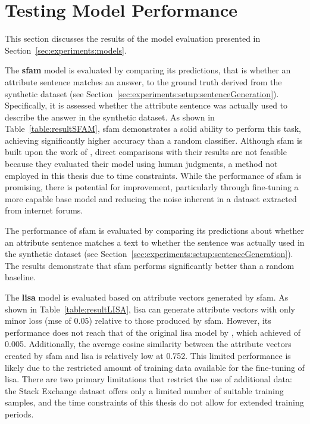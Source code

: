 \section{Testing Model Performance}%
\label{sec:evaluation:models}

This section discusses the results of the model evaluation presented in Section~\ref{sec:experiments:models}.

The \textbf{\acs{sfam}} model is evaluated by comparing its predictions, that is whether an attribute sentence matches an answer, to the ground truth derived from the synthetic dataset (see Section~\ref{sec:experiments:setup:sentenceGeneration}). Specifically, it is assessed whether the attribute sentence was actually used to describe the answer in the synthetic dataset. As shown in Table~\ref{table:resultSFAM}, \ac{sfam} demonstrates a solid ability to perform this task, achieving significantly higher accuracy than a random classifier. Although \ac{sfam} is built upon the work of \citet{patelLearningInterpretableStyle2023}, direct comparisons with their results are not feasible because they evaluated their model using human judgments, a method not employed in this thesis due to time constraints. While the performance of \ac{sfam} is promising, there is potential for improvement, particularly through fine-tuning a more capable base model and reducing the noise inherent in a dataset extracted from internet forums.

\begin{table}[ht]
  \caption[]{The performance of \ac{sfam} is evaluated by comparing its predictions about whether an attribute sentence matches a text to whether the sentence was actually used in the synthetic dataset (see Section~\ref{sec:experiments:setup:sentenceGeneration}). The results demonstrate that \ac{sfam} performs significantly better than a random baseline.}%
  \label{table:resultSFAM}
  \centering
  \resultSfam{}
\end{table}

The \textbf{\acs{lisa}} model is evaluated based on attribute vectors generated by \ac{sfam}. As shown in Table~\ref{table:resultLISA}, \ac{lisa} can generate attribute vectors with only minor loss (\acs{mse} of \num{0.05}) relative to those produced by \ac{sfam}. However, its performance does not reach that of the original \ac{lisa} model by \citet{patelLearningInterpretableStyle2023}, which achieved  of \num{0.005}. Additionally, the average cosine similarity between the attribute vectors created by \ac{sfam} and \ac{lisa} is relatively low at \num{0.752}. This limited performance is likely due to the restricted amount of training data available for the fine-tuning of \ac{lisa}. There are two primary limitations that restrict the use of additional data: the Stack Exchange dataset offers only a limited number of suitable training samples, and the time constraints of this thesis do not allow for extended training periods.

